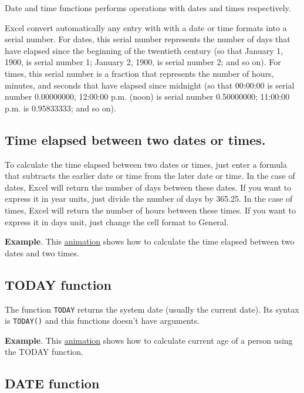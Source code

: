 Date and time functions performs operations with dates and times respectively.

Excel convert automatically any entry with with a date or time formats into a serial number. For dates, this serial number represents the number of days that have elapsed since the beginning of the twentieth century (so that January 1, 1900, is serial number 1; January 2, 1900, is serial number 2; and so on). For times, this serial number is a fraction that represents the number of hours, minutes, and seconds that have elapsed since midnight (so that  00:00:00 is serial number 0.00000000, 12:00:00 p.m. (noon) is serial number 0.50000000; 11:00:00 p.m. is 0.95833333; and so on).

\subsection{Time elapsed between two dates or times.}\hypertarget{time-elapsed-between-two-dates-or-times}{}\label{time-elapsed-between-two-dates-or-times}

To calculate the time elapsed between two dates or times, just enter a formula that subtracts the earlier date or time from the later date or time.
In the case of dates, Excel will return the number of days between these dates. If you want to express it in year units, just divide the number of days by 365.25. In the case of times, Excel will return the number of hours between these times. If you want to express it in days unit, just change the cell format to General.

\textbf{Example}. This \href{http://aprendeconalf.es/office/excel/manual/img/example_time_elapsed.gif}{animation} shows how to calculate the time elapsed between two dates and two times.

\subsection{TODAY function}\hypertarget{today-function}{}\label{today-function}

The function \texttt{TODAY} returns the system date (usually the current date). Its syntax is \texttt{TODAY()} and this functions doesn't have arguments.

\textbf{Example}. This \href{http://aprendeconalf.es/office/excel/manual/img/example_function_today.gif}{animation} shows how to calculate current age of a person using the TODAY function.

\subsection{DATE function}\hypertarget{date-function}{}\label{date-function}

